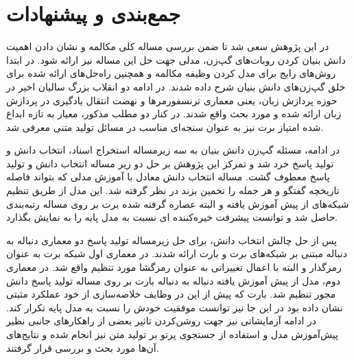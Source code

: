 \chapter{جمع‌بندی و پیشنهادات}\label{Chap6}

در این پژوهش سعی شد تا ضمن بررسی مساله کلی مکالمه و نشان دادن اهمیت دانش بنیان کردن روبات‌های گپ‌زن،‌ مدلی جهت حل این مساله نیز ارائه شود. 
در ابتدا روش‌های رایج برای مدل کردن وظیفه مکالمه و همچنین راه‌حل‌های ارائه شده برای خلق گپ‌زن‌های دانش بنیان شرح داده شدند. در ادامه دو انقلاب بزرگ سالیان اخیر در حوزه پردازش زبان، یعنی معماری ترنسفورمر‌ها و نهضت انتقال یادگیری در پردازش زبان ارائه شده و مورد بحث واقع شدند. در کنار دو مطلب مذکور، معیار به تازه ابداع شده امتیاز برت نیز به عنوان سنجه‌ای مناسب در مسائل تولید متنی معرفی شد. 

در ادامه، مسئله گپ‌زن دانش بنیان به سه زیرمساله استخراج اسناد،‌ انتخاب دانش و تولید پاسخ خرد شد و تمرکز این پژوهش بر حل دو زیر مساله انتخاب دانش و تولید پاسخ معطوف گشت. مساله انتخاب دانش معادل با آموزش مدلی که بتواند فاصله تاریخچه گفتگو و هر جمله را تخمین بزند در نظر گرفته شد. این مدل از طریق تنظیم شبکه‌های از پیش آموزش یافته و البته عصاره گرفته شده برت بر روی مساله رتبه‌بندی حاصل شد و توانست پیشرفت خیره‌کننده ای نسبت به مدل پایه را به نمایش بگذارد. 

پس از حل چالش انتخاب دانش، برای حل زیرمساله تولید پاسخ دو معماری دنباله به دنباله
مبتنی بر شبکه‌های برت و بارت ارائه شدند. در معماری اول شبکه برت به عنوان رمزگذار و البته با اعمال تغییراتی به عنوان رمزگشا مورد تنظیم واقع شد. در معماری دوم، مدل از پیش آموزش یافته دنباله به دنباله بارت بر روی مساله تولید پاسخ دانش مجور تنظیم شد. بارت که پیش از این در وظایف خلاصه‌سازی از خود عملکرد مثبتی نشان داده بود در این جا نیز توانست موفقیت خودش را نسبت به مدل پایه تکرار کند. در ادامه آزمایشاتی نیز جهت روشن‌کردن تاثیر بعضی از راهکار‌های جانبی نظیر پیش‌آموزش مدل و استفاده از جستجوی پرتو بر تولید متن نیز انجام شده و نتایج‌های آن‌ها مورد بحث و بررسی قرار گرفتند. 
